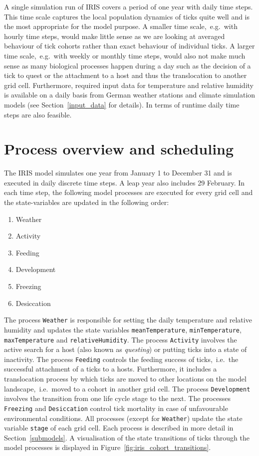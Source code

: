 \documentclass[a4paper, 11pt]{scrartcl}
\newcommand{\inlinecode}[1]{\texttt{\small #1}}
\begin{document}
A single simulation run of IRIS covers a period of one year with daily time steps. This time scale captures the local population dynamics of ticks quite well and is the most appropriate for the model purpose. A smaller time scale,~e.g.\ with hourly time steps, would make little sense as we are looking at averaged behaviour of tick cohorts rather than exact behaviour of individual ticks. A larger time scale,~e.g.\ with weekly or monthly time steps, would also not make much sense as many biological processes happen during a day such as the decision of a tick to quest or the attachment to a host and thus the translocation to another grid cell. Furthermore, required input data for temperature and relative humidity is available on a daily basis from German weather stations and climate simulation models (see Section~\ref{input_data} for details). In terms of runtime daily time steps are also feasible.


\section{Process overview and scheduling}
The IRIS model simulates one year from January 1 to December 31 and is executed in daily discrete time steps. A leap year also includes 29 February. In each time step, the following model processes are executed for every grid cell and the state-variables are updated in the following order:

\begin{enumerate}[noitemsep]
	\item Weather
	\item Activity
	\item Feeding
	\item Development
	\item Freezing
	\item Desiccation
\end{enumerate}

The process \inlinecode{Weather} is responsible for setting the daily temperature and relative humidity and updates the state variables \inlinecode{meanTemperature}, \inlinecode{minTemperature}, \inlinecode{maxTemperature} and \inlinecode{relativeHumidity}. The process \inlinecode{Activity} involves the active search for a host (also known as \textit{questing}) or putting ticks into a state of inactivity. The process \inlinecode{Feeding} controls the feeding success of ticks,~i.e.\ the successful attachment of a ticks to a hosts. Furthermore, it includes a translocation process by which ticks are moved to other locations on the model landscape,~i.e.\ moved to a cohort in another grid cell. The process \inlinecode{Development} involves the transition from one life cycle stage to the next. The processes \inlinecode{Freezing} and \inlinecode{Desiccation} control tick mortality in case of unfavourable environmental conditions. All processes (except for \inlinecode{Weather}) update the state variable \inlinecode{stage} of each grid cell. Each process is described in more detail in Section~\ref{submodels}. A visualisation of the state transitions of ticks through the model processes is displayed in Figure~\ref{fig:iris_cohort_transitions}.
\end{document}

